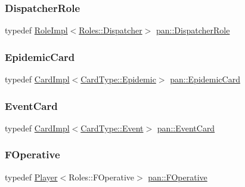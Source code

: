 \mbox{\label{namespacepan_a12e950ceae92e469668e9d7a5ce6c629}} 
\subsubsection{\texorpdfstring{Dispatcher\+Role}{DispatcherRole}}
{\footnotesize\ttfamily typedef \hyperlink{classpan_1_1_role_impl}{Role\+Impl}$<$\hyperlink{namespacepan_a5017f84fa51152eae453759537d1ced6adbfcc2e96980bb87c34df3809193c62a}{Roles\+::\+Dispatcher}$>$ \hyperlink{namespacepan_a12e950ceae92e469668e9d7a5ce6c629}{pan\+::\+Dispatcher\+Role}}

\mbox{\label{namespacepan_aa8e418f131c97133de2a86d1d94a98d3}} 
\subsubsection{\texorpdfstring{Epidemic\+Card}{EpidemicCard}}
{\footnotesize\ttfamily typedef \hyperlink{classpan_1_1_card_impl}{Card\+Impl}$<$\hyperlink{namespacepan_a1f7350bfd0421afeabe9fa95c16fa811a62eff626cf0804badc417196cfd09a12}{Card\+Type\+::\+Epidemic}$>$ \hyperlink{namespacepan_aa8e418f131c97133de2a86d1d94a98d3}{pan\+::\+Epidemic\+Card}}

\mbox{\label{namespacepan_ab3f94f87c22e9ba090564fe9bba65b98}} 
\subsubsection{\texorpdfstring{Event\+Card}{EventCard}}
{\footnotesize\ttfamily typedef \hyperlink{classpan_1_1_card_impl}{Card\+Impl}$<$\hyperlink{namespacepan_a1f7350bfd0421afeabe9fa95c16fa811aa4ecfc70574394990cf17bd83df499f7}{Card\+Type\+::\+Event}$>$ \hyperlink{namespacepan_ab3f94f87c22e9ba090564fe9bba65b98}{pan\+::\+Event\+Card}}

\mbox{\label{namespacepan_a1d40de3e068a7ad89e8896a584f62f2e}} 
\subsubsection{\texorpdfstring{F\+Operative}{FOperative}}
{\footnotesize\ttfamily typedef \hyperlink{classpan_1_1_player}{Player}$<$Roles\+::\+F\+Operative$>$ \hyperlink{namespacepan_a1d40de3e068a7ad89e8896a584f62f2e}{pan\+::\+F\+Operative}}

